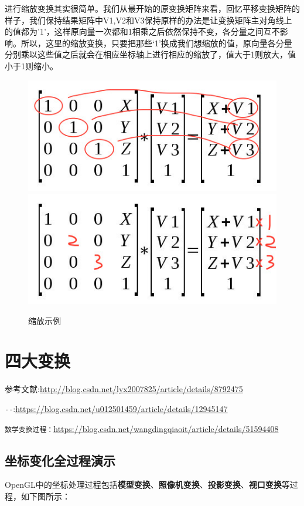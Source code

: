 \documentclass[UTF8,a4paper,8pt]{ctexbook}
\begin{document}
		进行缩放变换其实很简单。我们从最开始的原变换矩阵来看，回忆平移变换矩阵的样子，我们保持结果矩阵中V1,V2和V3保持原样的办法是让变换矩阵主对角线上的值都为’1’，这样原向量一次都和1相乘之后依然保持不变，各分量之间互不影响。所以，这里的缩放变换，只要把那些‘1’换成我们想缩放的值，原向量各分量分别乘以这些值之后就会在相应坐标轴上进行相应的缩放了，值大于1则放大，值小于1则缩小。
		
		\begin{figure}[h]
			\centering
			\includegraphics[scale = 0.57]{scale_1.png}
			\includegraphics[scale = 0.57]{scale_2.png}
			\caption{缩放示例}
		\end{figure}

\chapter{四大变换}
参考文献:\url{http://blog.csdn.net/lyx2007825/article/details/8792475}

\verb|--|:\url{https://blog.csdn.net/u012501459/article/details/12945147}

\verb|数学变换过程：|\url{https://blog.csdn.net/wangdingqiaoit/article/details/51594408}

	\section{坐标变化全过程演示}
		OpenGL中的坐标处理过程包括\textbf{模型变换}、\textbf{照像机变换}、\textbf{投影变换}、\textbf{视口变换}等过程，如下图所示：
		
\end{document}
